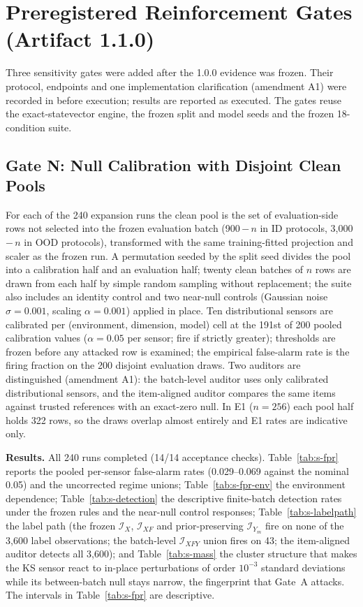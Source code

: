 \documentclass[10pt,journal,compsoc]{IEEEtran}
\newcommand{\IX}{\mathcal I_X}
\newcommand{\IXF}{\mathcal I_{XF}}
\newcommand{\IYm}{\mathcal I_{Y_m}}
\newcommand{\IXFY}{\mathcal I_{XFY}}
\begin{document}


\section{Preregistered Reinforcement Gates (Artifact 1.1.0)}

Three sensitivity gates were added after the 1.0.0 evidence was frozen. Their
protocol, endpoints and one implementation clarification (amendment A1) were
recorded in  before
execution; results are reported as executed. The gates reuse the
exact-statevector engine, the frozen split and model seeds and the frozen
18-condition suite.

\subsection{Gate N: Null Calibration with Disjoint Clean Pools}

For each of the 240 expansion runs the clean pool is the set of
evaluation-side rows not selected into the frozen evaluation batch
(900\,$-$\,$n$ in ID protocols, 3{,}000\,$-$\,$n$ in OOD protocols),
transformed with the same training-fitted projection and scaler as the frozen
run. A permutation seeded by the split seed divides the pool into a
calibration half and an evaluation half; twenty clean batches of $n$ rows are
drawn from each half by simple random sampling without replacement; the suite
also includes an identity control and two near-null controls (Gaussian noise
$\sigma=0.001$, scaling $\alpha=0.001$) applied in place. Ten distributional
sensors are calibrated per (environment, dimension, model) cell at the 191st
of 200 pooled calibration values ($\alpha=0.05$ per sensor; fire if strictly
greater); thresholds are frozen before any attacked row is examined; the
empirical false-alarm rate is the firing fraction on the 200 disjoint
evaluation draws. Two auditors are distinguished (amendment A1): the
batch-level auditor uses only calibrated distributional sensors, and the
item-aligned auditor compares the same items against trusted references with
an exact-zero null. In E1 ($n=256$) each pool half holds 322 rows, so the
draws overlap almost entirely and E1 rates are indicative only.

\textbf{Results.} All 240 runs completed (14/14 acceptance checks).
Table~\ref{tab:s-fpr} reports the pooled per-sensor false-alarm rates
(0.029--0.069 against the nominal 0.05) and the uncorrected regime unions;
Table~\ref{tab:s-fpr-env} the environment dependence; Table~\ref{tab:s-detection}
the descriptive finite-batch detection rates under the frozen rules and the near-null control responses;
Table~\ref{tab:s-labelpath} the label path (the frozen $\IX$, $\IXF$ and
prior-preserving $\IYm$ fire on none of the 3,600 label observations; the
batch-level $\IXFY$ union fires on 43; the item-aligned auditor detects all
3,600); and Table~\ref{tab:s-mass} the cluster structure that makes the KS
sensor react to in-place perturbations of order $10^{-3}$ standard
deviations while its between-batch null stays narrow, the fingerprint that
Gate~A attacks. The intervals in Table~\ref{tab:s-fpr} are descriptive.
\end{document}
